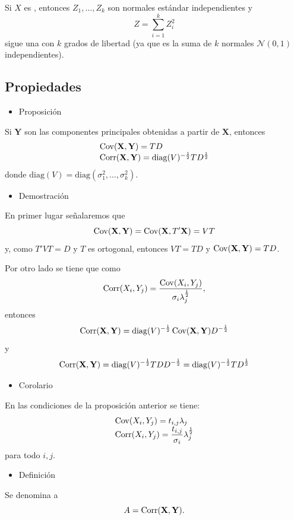 Si $X$ es , entonces $Z_1,\dots,Z_k$ son normales estándar independientes y \[ Z=\sum_{i=1}^{k}Z_i^2 \]sigue una  con $k$ grados de libertad (ya que es la suma de $k$ normales $\mathcal{N}(0,1)$ independientes).
\subsection{Propiedades}
\begin{itemize}[label=\color{red}\textbullet, leftmargin=*]
	\item \color{lightblue}Proposición
\end{itemize}
Si $\mathbf{Y}$ son las componentes principales obtenidas a partir de $\mathbf{X}$, entonces \[ \begin{array}{l}
	\operatorname{Cov}(\mathbf{X,Y})=TD\\
	\operatorname{Corr}(\mathbf{X,Y})=\mathrm{diag}(V)^{-\frac{1}{2}}TD^{\frac{1}{2}}
\end{array} \] donde $\mathrm{diag}(V)=\mathrm{diag}(\sigma_1^2,\dots,\sigma_k^2)$.
\begin{itemize}[label=\color{red}\textbullet, leftmargin=*]
	\item \color{lightblue}Demostración
\end{itemize}
En primer lugar señalaremos que \[ \operatorname{Cov}(\mathbf{X,Y})=\operatorname{Cov}(\mathbf{X},T'\mathbf{X})=VT \] y, como $T'VT=D$ y $T$ es ortogonal, entonces $VT=TD$ y $\operatorname{Cov}(\mathbf{X,Y})=TD$.

Por otro lado se tiene que como \[ \operatorname{Corr}(X_i,Y_j)=\dfrac{\operatorname{Cov}(X_i,Y_j)}{\sigma_i\lambda_j^{\frac{1}{2}}}, \]entonces \[ \operatorname{Corr}(\mathbf{X,Y})=\mathrm{diag}(V)^{-\frac{1}{2}}\operatorname{Cov}(\mathbf{X,Y})D^{-\frac{1}{2}} \]y\[ \operatorname{Corr}(\mathbf{X,Y})=\mathrm{diag}(V)^{-\frac{1}{2}}TDD^{-\frac{1}{2}}=\mathrm{diag}(V)^{-\frac{1}{2}}TD^{\frac{1}{2}} \]
\begin{itemize}[label=\color{red}\textbullet, leftmargin=*]
	\item \color{lightblue}Corolario
\end{itemize}
En las condiciones de la proposición anterior se tiene: \[ \begin{array}{l}
	\operatorname{Cov}(X_i,Y_j)=t_{i,j}\lambda_j\\
	\operatorname{Corr}(X_i,Y_j)=\dfrac{t_{i,j}}{\sigma_i}\lambda_j^{\frac{1}{2}}
\end{array} \] para todo $i,j$.
\begin{itemize}[label=\color{red}\textbullet, leftmargin=*]
	\item \color{lightblue}Definición
\end{itemize}
Se denomina  a \[ A=\operatorname{Corr}(\mathbf{X,Y}). \]